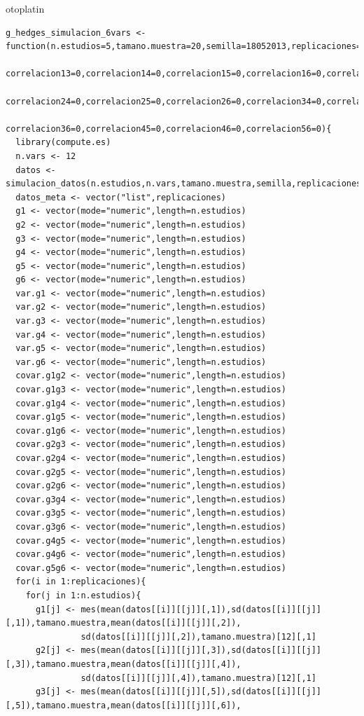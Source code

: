 otoplatin\documentclass[a4paper,openright,12pt]{report}
\begin{document}
{\begin{verbatim}
g_hedges_simulacion_6vars <- function(n.estudios=5,tamano.muestra=20,semilla=18052013,replicaciones=5,correlacion12=0,
                                      correlacion13=0,correlacion14=0,correlacion15=0,correlacion16=0,correlacion23=0,
                                      correlacion24=0,correlacion25=0,correlacion26=0,correlacion34=0,correlacion35=0,
                                      correlacion36=0,correlacion45=0,correlacion46=0,correlacion56=0){
  library(compute.es)
  n.vars <- 12
  datos <- simulacion_datos(n.estudios,n.vars,tamano.muestra,semilla,replicaciones)
  datos_meta <- vector("list",replicaciones)
  g1 <- vector(mode="numeric",length=n.estudios)
  g2 <- vector(mode="numeric",length=n.estudios)
  g3 <- vector(mode="numeric",length=n.estudios)
  g4 <- vector(mode="numeric",length=n.estudios)
  g5 <- vector(mode="numeric",length=n.estudios)
  g6 <- vector(mode="numeric",length=n.estudios)
  var.g1 <- vector(mode="numeric",length=n.estudios)
  var.g2 <- vector(mode="numeric",length=n.estudios)
  var.g3 <- vector(mode="numeric",length=n.estudios)
  var.g4 <- vector(mode="numeric",length=n.estudios)
  var.g5 <- vector(mode="numeric",length=n.estudios)
  var.g6 <- vector(mode="numeric",length=n.estudios)
  covar.g1g2 <- vector(mode="numeric",length=n.estudios) 
  covar.g1g3 <- vector(mode="numeric",length=n.estudios)
  covar.g1g4 <- vector(mode="numeric",length=n.estudios) 
  covar.g1g5 <- vector(mode="numeric",length=n.estudios) 
  covar.g1g6 <- vector(mode="numeric",length=n.estudios) 
  covar.g2g3 <- vector(mode="numeric",length=n.estudios)
  covar.g2g4 <- vector(mode="numeric",length=n.estudios) 
  covar.g2g5 <- vector(mode="numeric",length=n.estudios) 
  covar.g2g6 <- vector(mode="numeric",length=n.estudios) 
  covar.g3g4 <- vector(mode="numeric",length=n.estudios) 
  covar.g3g5 <- vector(mode="numeric",length=n.estudios) 
  covar.g3g6 <- vector(mode="numeric",length=n.estudios) 
  covar.g4g5 <- vector(mode="numeric",length=n.estudios) 
  covar.g4g6 <- vector(mode="numeric",length=n.estudios) 
  covar.g5g6 <- vector(mode="numeric",length=n.estudios) 
  for(i in 1:replicaciones){
    for(j in 1:n.estudios){
      g1[j] <- mes(mean(datos[[i]][[j]][,1]),sd(datos[[i]][[j]][,1]),tamano.muestra,mean(datos[[i]][[j]][,2]),
               sd(datos[[i]][[j]][,2]),tamano.muestra)[12][,1]
      g2[j] <- mes(mean(datos[[i]][[j]][,3]),sd(datos[[i]][[j]][,3]),tamano.muestra,mean(datos[[i]][[j]][,4]),
               sd(datos[[i]][[j]][,4]),tamano.muestra)[12][,1]
      g3[j] <- mes(mean(datos[[i]][[j]][,5]),sd(datos[[i]][[j]][,5]),tamano.muestra,mean(datos[[i]][[j]][,6]),

\end{verbatim}}
\end{document}
